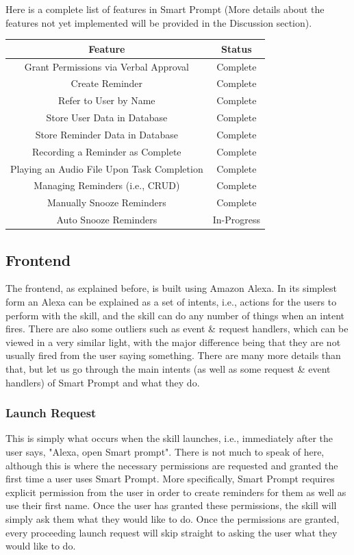 \documentclass[11pt, oneside]{article}
\begin{document}
Here is a complete list of features in Smart Prompt (More details about the features not yet implemented will be provided in the Discussion section).
\begin{center}
\begin{tabular}{| c | c |}
 \hline
 Feature & Status \\ [0.5ex] 
 \hline\hline
 Grant Permissions via Verbal Approval & Complete \\
 \hline
 Create Reminder & Complete \\
 \hline
 Refer to User by Name & Complete \\
 \hline
 Store User Data in Database & Complete \\
 \hline
 Store Reminder Data in Database & Complete \\
 \hline
 Recording a Reminder as Complete & Complete \\
 \hline
 Playing an Audio File Upon Task Completion & Complete \\
 \hline
 Managing Reminders (i.e., CRUD) & Complete \\
 \hline
 Manually Snooze Reminders & Complete \\
 \hline
 Auto Snooze Reminders & In-Progress \\
 \hline
\end{tabular}
\end{center}

\subsection{Frontend}

The frontend, as explained before, is built using Amazon Alexa. 
In its simplest form an Alexa can be explained as a set of intents, i.e., actions for the users to perform with the skill, and the skill can do any number of things when an intent fires. 
There are also some outliers such as event \& request handlers, which can be viewed in a very similar light, with the major difference being that they are not usually fired from the user saying something. 
There are many more details than that, but let us go through the main intents (as well as some request \& event handlers) of Smart Prompt and what they do. 

\subsubsection{Launch Request}

This is simply what occurs when the skill launches, i.e., immediately after the user says, "Alexa, open Smart prompt". 
There is not much to speak of here, although this is where the necessary permissions are requested and granted the first time a user uses Smart Prompt. 
More specifically, Smart Prompt requires explicit permission from the user in order to create reminders for them as well as use their first name. 
Once the user has granted these permissions, the skill will simply ask them what they would like to do. 
Once the permissions are granted, every proceeding launch request will skip straight to asking the user what they would like to do. 
\end{document}
